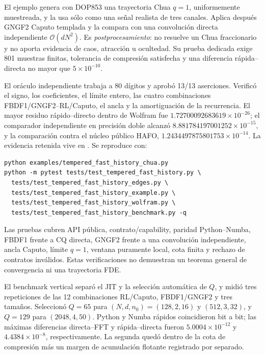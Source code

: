 El ejemplo  genera con
DOP853 una trayectoria Chua \(q=1\), uniformemente muestreada, y la usa sólo
como una señal realista de tres canales. Aplica después GNGF2 Caputo templada y
la compara con una convolución directa independiente
\(\mathcal O(dN^2)\). Es \emph{postprocesamiento}: no resuelve un Chua
fraccionario y no aporta evidencia de caos, atracción u ocultedad. Su prueba
dedicada exige 801 muestras finitas, tolerancia de compresión satisfecha y una
diferencia rápida--directa no mayor que \(5\times10^{-10}\).

El oráculo independiente
trabaja a 80 dígitos y aprobó 13/13 aserciones. Verificó el signo, los
coeficientes, el límite entero, las cuatro combinaciones
FBDF1/GNGF2--RL/Caputo, el ancla y la amortiguación de la recurrencia. El mayor
residuo rápido--directo dentro de Wolfram fue
\(1.72700092683619\times10^{-26}\); el comparador independiente en precisión
doble alcanzó \(8.881784197001252\times10^{-15}\), y la comparación contra el
núcleo público HAFO, \(1.2434497875801753\times10^{-14}\). La evidencia
retenida vive en
.
Se reproduce con:
\begin{verbatim}
python examples/tempered_fast_history_chua.py
python -m pytest tests/test_tempered_fast_history.py \
  tests/test_tempered_fast_history_edges.py \
  tests/test_tempered_fast_history_example.py \
  tests/test_tempered_fast_history_wolfram.py \
  tests/test_tempered_fast_history_benchmark.py -q
\end{verbatim}
Las pruebas cubren API pública, contrato/capability, paridad Python--Numba,
FBDF1 frente a CQ directa, GNGF2 frente a una convolución independiente,
ancla Caputo, límite \(q=1\), ventana puramente local, cota finita y rechazo de
contratos inválidos. Estas verificaciones no demuestran un teorema general de
convergencia ni una trayectoria FDE.

El benchmark vertical
\codepath{benchmarks/bench_tempered_fast_history.py} separó el JIT y la
selección automática de \(Q\), y midió tres repeticiones de las 12 combinaciones
RL/Caputo, FBDF1/GNGF2 y tres tamaños. Seleccionó \(Q=65\) para
\((N,d,n_0)=(128,2,16)\) y \((512,3,32)\), y \(Q=129\) para
\((2048,4,50)\). Python y Numba rápidos coincidieron bit a bit; las máximas
diferencias directa--FFT y rápida--directa fueron
\(5.0004\times10^{-12}\) y \(4.4384\times10^{-8}\), respectivamente. La
segunda quedó dentro de la cota de compresión más un margen de acumulación
flotante registrado por separado.

